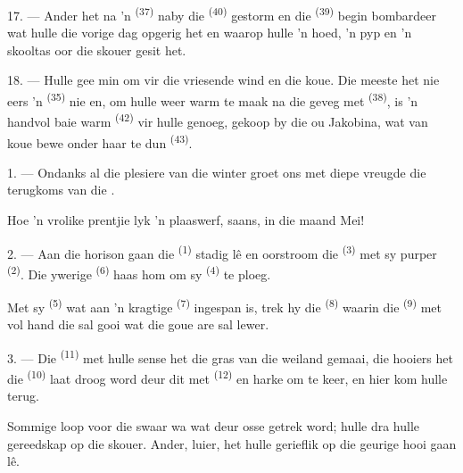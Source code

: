 17. --- Ander het na 'n  \textsuperscript{(37)} naby die
 \textsuperscript{(40)} gestorm en die 
\textsuperscript{(39)} begin bombardeer wat hulle die vorige dag opgerig het en waarop
hulle 'n hoed, 'n pyp en 'n skooltas oor die skouer gesit het.

18. --- Hulle gee min om vir die vriesende wind en die koue. Die meeste het nie eers 'n
 \textsuperscript{(35)} nie en, om hulle weer warm te maak na die geveg met
 \textsuperscript{(38)}, is 'n handvol baie warm 
\textsuperscript{(42)} vir hulle genoeg, gekoop by die ou 
Jakobina, wat van koue bewe onder haar te dun  \textsuperscript{(43)}.

\VUsaut{3.0mm}
\VUsaut{3.0mm}

\VUsaut{4.0mm}

1. --- Ondanks al die plesiere van die winter groet ons met diepe vreugde die terugkoms
van die .

Hoe 'n vrolike prentjie lyk 'n plaaswerf, saans, in die maand Mei!

2. --- Aan die horison gaan die  \textsuperscript{(1)} stadig lê en oorstroom
die  \textsuperscript{(3)} met sy purper 
\textsuperscript{(2)}. Die ywerige  \textsuperscript{(6)} haas hom om sy
 \textsuperscript{(4)} te ploeg.

Met sy  \textsuperscript{(5)} wat aan 'n kragtige 
\textsuperscript{(7)} ingespan is, trek hy die  \textsuperscript{(8)} waarin
die  \textsuperscript{(9)} met vol hand die  sal gooi wat die
goue are sal lewer.

3. --- Die  \textsuperscript{(11)} met hulle sense het die gras van die
weiland gemaai, die hooiers het die  \textsuperscript{(10)} laat droog word
deur dit met  \textsuperscript{(12)} en harke om te keer, en hier kom hulle
terug.

Sommige loop voor die swaar wa wat deur osse getrek word; hulle dra hulle gereedskap op
die skouer. Ander, luier, het hulle gerieflik op die geurige hooi gaan lê.

